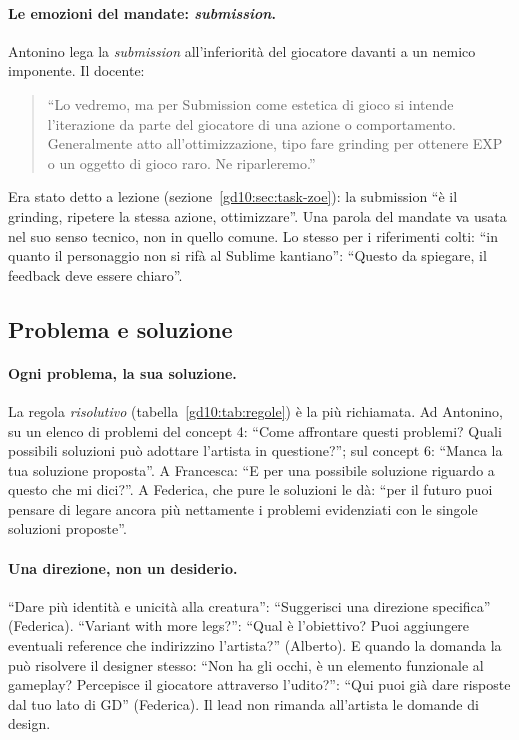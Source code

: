 \paragraph{Le emozioni del mandate: \emph{submission}.} Antonino lega la
\emph{submission} all'inferiorità del giocatore davanti a un nemico imponente.
Il docente:
\begin{quote}
  ``Lo vedremo, ma per Submission come estetica di gioco si intende
  l'iterazione da parte del giocatore di una azione o comportamento.
  Generalmente atto all'ottimizzazione, tipo fare grinding per ottenere EXP o
  un oggetto di gioco raro. Ne riparleremo.''
\end{quote}
Era stato detto a lezione (sezione~\ref{gd10:sec:task-zoe}): la submission
``è il grinding, ripetere la stessa azione, ottimizzare''. Una parola del
mandate va usata nel suo senso tecnico, non in quello comune. Lo stesso per
i riferimenti colti: ``in quanto il personaggio non si rifà al Sublime
kantiano'': ``Questo da spiegare, il feedback deve essere chiaro''.

\subsection{Problema e soluzione}
\label{rv:t6:sec:soluzione}

\paragraph{Ogni problema, la sua soluzione.} La regola \emph{risolutivo}
(tabella~\ref{gd10:tab:regole}) è la più richiamata. Ad Antonino, su un
elenco di problemi del concept 4: ``Come affrontare questi problemi? Quali
possibili soluzioni può adottare l'artista in questione?''; sul concept 6:
``Manca la tua soluzione proposta''. A Francesca: ``E per una possibile
soluzione riguardo a questo che mi dici?''. A Federica, che pure le soluzioni
le dà: ``per il futuro puoi pensare di legare ancora più nettamente i
problemi evidenziati con le singole soluzioni proposte''.

\paragraph{Una direzione, non un desiderio.} ``Dare più identità e unicità
alla creatura'': ``Suggerisci una direzione specifica'' (Federica). ``Variant
with more legs?'': ``Qual è l'obiettivo? Puoi aggiungere eventuali reference
che indirizzino l'artista?'' (Alberto). E quando la domanda la può risolvere
il designer stesso: ``Non ha gli occhi, è un elemento funzionale al gameplay?
Percepisce il giocatore attraverso l'udito?'': ``Qui puoi già dare risposte
dal tuo lato di GD'' (Federica). Il lead non rimanda all'artista le domande
di design.

